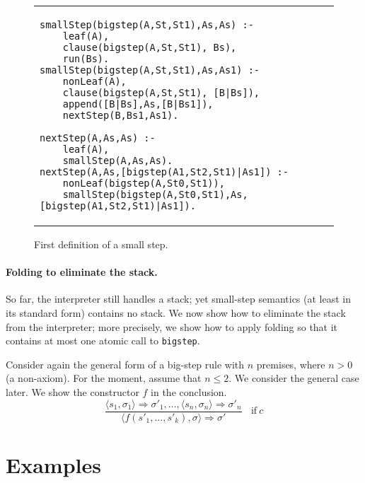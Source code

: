 \documentclass{llncs}
\begin{document}
\begin{figure}
\begin{tabular}{l}
\begin{lstlisting}
smallStep(bigstep(A,St,St1),As,As) :- 
    leaf(A),
    clause(bigstep(A,St,St1), Bs),
    run(Bs).
smallStep(bigstep(A,St,St1),As,As1) :- 
    nonLeaf(A),
    clause(bigstep(A,St,St1), [B|Bs]),
    append([B|Bs],As,[B|Bs1]),
    nextStep(B,Bs1,As1).
    
nextStep(A,As,As) :-
    leaf(A),
    smallStep(A,As,As).
nextStep(A,As,[bigstep(A1,St2,St1)|As1]) :-
    nonLeaf(bigstep(A,St0,St1)),
    smallStep(bigstep(A,St0,St1),As,[bigstep(A1,St2,St1)|As1]).
\end{lstlisting}
\end{tabular}
\caption{First definition of a small step.}\label{fig:linear-nextstep}
\end{figure}

\paragraph{Folding to eliminate the stack.}  So far, the interpreter still handles a stack; yet small-step semantics (at least in its standard form)
contains no stack.  We now show how to eliminate the stack from the interpreter;  more precisely, we show how to apply folding so that it
contains at most one atomic call to \texttt{bigstep}.

Consider again the general form of a big-step rule with $n$ premises, where $n>0$ (a non-axiom).  For the moment,
assume that $n\le 2$.  We consider the general case later. We show the constructor $f$ in
the conclusion.  
\[
\dfrac{\langle s_1, \sigma_1\rangle \Rightarrow \sigma'_1, \ldots, \langle s_n, \sigma_n\rangle \Rightarrow \sigma'_n}
{\langle f(s'_1,\ldots,s'_k), \sigma\rangle \Rightarrow \sigma'} 
~~~~\mathrm{if }~ c
\]


\section{Examples}\label{examples}

%

\end{document}
